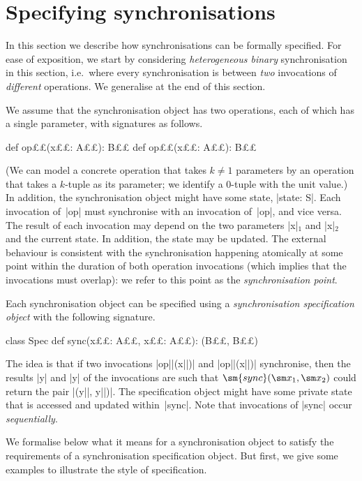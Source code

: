 \section{Specifying synchronisations}
\label{sec:spec}

In this section we describe how synchronisations can be formally specified.
For ease of exposition, we start by considering \emph{heterogeneous binary}
synchronisation in this section, i.e.~where every synchronisation is between
\emph{two} invocations of \emph{different} operations.  We generalise at the
end of this section.

We assume that the synchronisation object has two operations, each of which
has a single parameter, with signatures as follows.
%
\begin{scala}
  def op££(x££: A££): B££
  def op££(x££: A££): B££
\end{scala}
%
(We can model a concrete operation that takes $k \ne 1$ parameters by an
operation that takes a $k$-tuple as its parameter; we identify a 0-tuple with
the unit value.)
%
In addition, the synchronisation object might have some state, |state: S|.
Each invocation of~|op| must synchronise with an invocation of~|op|, and
vice versa.  The result of each invocation may depend on the two parameters
|x|$_1$ and |x|$_2$ and the current state.  In addition, the state may be
updated.  The external behaviour is consistent with the synchronisation
happening atomically at some point within the duration of both operation
invocations (which implies that the invocations must overlap): we refer to this
point as the \emph{synchronisation point}.

Each synchronisation object can be specified using a \emph{synchronisation
  specification object} with the following signature.
%
\begin{scala}
class Spec{
  def sync(x££: A££, x££: A££): (B££, B££)
}
\end{scala}
%
The idea is that if two invocations |op||(x||)| and |op||(x||)|
synchronise, then the results |y| and |y| of the invocations are such
that $\sm{sync}(\sm x_1, \sm x_2)$ could return the pair |(y||, y||)|.
The specification object might have some private state that is accessed and
updated within~|sync|.  Note that invocations of |sync| occur
\emph{sequentially}.

We formalise below what it means for a synchronisation object to satisfy the
requirements of a synchronisation specification object.  But first, we give
some examples to illustrate the style of specification. 


